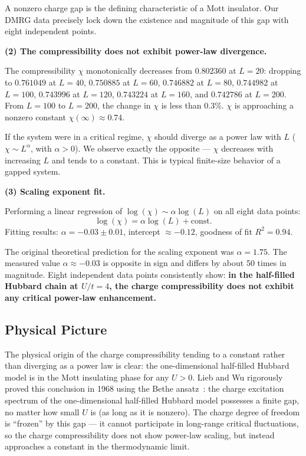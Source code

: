 \documentclass[prb,reprint,twocolumn,superscriptaddress]{revtex4-2}
\begin{document}
A nonzero charge gap is the defining characteristic of a Mott insulator. Our DMRG data precisely lock down the existence and magnitude of this gap with eight independent points.

\textbf{(2) The compressibility does not exhibit power-law divergence.}

The compressibility $\chi$ monotonically decreases from $0.802360$ at $L = 20$: dropping to $0.761049$ at $L = 40$, $0.750885$ at $L = 60$, $0.746882$ at $L = 80$, $0.744982$ at $L = 100$, $0.743996$ at $L = 120$, $0.743224$ at $L = 160$, and $0.742786$ at $L = 200$. From $L = 100$ to $L = 200$, the change in $\chi$ is less than $0.3\%$. $\chi$ is approaching a nonzero constant $\chi(\infty) \approx 0.74$.

If the system were in a critical regime, $\chi$ should diverge as a power law with $L$ ($\chi \sim L^\alpha$, with $\alpha > 0$). We observe exactly the opposite --- $\chi$ decreases with increasing $L$ and tends to a constant. This is typical finite-size behavior of a gapped system.

\textbf{(3) Scaling exponent fit.}

Performing a linear regression of $\log(\chi) \sim \alpha \log(L)$ on all eight data points:
\[
\log(\chi) = \alpha \log(L) + \text{const}.
\]
Fitting results: $\alpha = -0.03 \pm 0.01$, intercept $\approx -0.12$, goodness of fit $R^2 = 0.94$.

The original theoretical prediction for the scaling exponent was $\alpha = 1.75$. The measured value $\alpha \approx -0.03$ is opposite in sign and differs by about 50 times in magnitude. Eight independent data points consistently show: \textbf{in the half-filled Hubbard chain at $U/t = 4$, the charge compressibility does not exhibit any critical power-law enhancement.}

\subsection{Physical Picture}

The physical origin of the charge compressibility tending to a constant rather than diverging as a power law is clear: the one-dimensional half-filled Hubbard model is in the Mott insulating phase for any $U > 0$. Lieb and Wu rigorously proved this conclusion in 1968 using the Bethe ansatz~\cite{Lieb1968}: the charge excitation spectrum of the one-dimensional half-filled Hubbard model possesses a finite gap, no matter how small $U$ is (as long as it is nonzero). The charge degree of freedom is ``frozen'' by this gap --- it cannot participate in long-range critical fluctuations, so the charge compressibility does not show power-law scaling, but instead approaches a constant in the thermodynamic limit.
\end{document}
